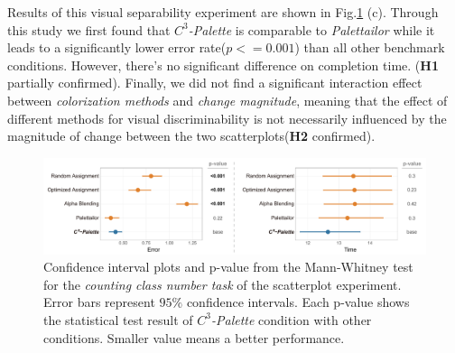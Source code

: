 {
Results of this visual separability experiment are shown in Fig.\ref{fig:userResults} (c).
Through this study we first found that \emph{$C^3$-Palette} is comparable to \emph{Palettailor} while it leads to a significantly lower error rate(\emph{$p<=0.001$}) than all other benchmark conditions.
However, there's no significant difference on completion time. (\textbf{H1} partially confirmed).
Finally, we did not find a significant interaction effect between \emph{colorization methods} and \emph{change magnitude}, meaning that the effect of different methods for visual discriminability is not necessarily influenced by the magnitude of change between the two scatterplots(\textbf{H2} confirmed).

\begin{figure}[h]
\centering
\includegraphics[width=1\linewidth]{figures/counting-results.pdf}
\caption{Confidence interval plots and p-value from the Mann-Whitney test for the \emph{counting class number task} of the scatterplot experiment. Error bars represent $95\%$ confidence intervals. Each p-value shows the statistical test result of \emph{$C^3$-Palette} condition with other conditions. Smaller value means a better performance.}
\vspace*{-3mm}
\label{fig:userResults}
\end{figure}

}
